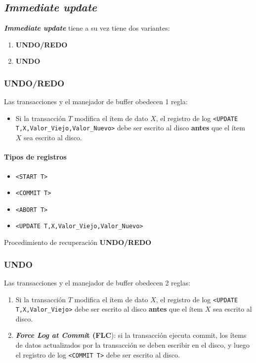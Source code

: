 \documentclass[a4paper, twoside]{article}
\newcommand{\codedir}{../resources/code} %
\begin{document}
\subsection{\emph{Immediate update}}
\textbf{\emph{Immediate update}} tiene a su vez tiene dos variantes:
\begin{enumerate}
	\item \textbf{UNDO/REDO}
	\item \textbf{UNDO}
\end{enumerate}

\subsubsection{UNDO/REDO}
Las transacciones y el manejador de buffer obedecen 1 regla:
\begin{itemize}
	\item Si la transacción $T$ modifica el ítem de dato $X$, el registro de log \texttt{<UPDATE T,X,Valor\_Viejo,Valor\_Nuevo>} debe ser escrito al disco \textbf{antes} que el ítem $X$ sea escrito al disco.
\end{itemize}

\paragraph{Tipos de registros}
\begin{itemize}
	\item \texttt{<START T>}
	\item \texttt{<COMMIT T>}
	\item \texttt{<ABORT T>}
	\item \texttt{<UPDATE T,X,Valor\_Viejo,Valor\_Nuevo>}
\end{itemize}
				
\begin{algorithm}[H]
	
	\caption{Procedimiento de recuperación \textbf{UNDO/REDO}}
\end{algorithm}

\subsubsection{UNDO}
Las transacciones y el manejador de buffer obedecen 2 reglas:
\begin{enumerate}
	\item Si la transacción $T$ modifica el ítem de dato $X$, el registro de log \texttt{<UPDATE T,X,Valor\_Viejo>} debe ser escrito al disco \textbf{antes} que el ítem $X$ sea escrito al disco.
	\item \textbf{\emph{Force Log at Commi}}\textbf{t (FLC}): si la transacción ejecuta commit, los ítems de datos actualizados por la transacción se deben escribir en el disco, y luego el registro de log \texttt{<COMMIT T>} debe ser escrito al disco.
\end{enumerate}
\end{document}
